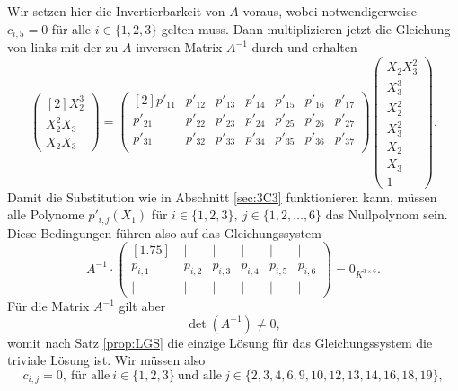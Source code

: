 \documentclass[a4paper,oneside, 11pt, openany%
]{article}
\theoremstyle{custom}
\theoremstyle{custom}
\begin{document}
	Wir setzen hier die Invertierbarkeit von $A$  voraus, wobei notwendigerweise $c_{i,5}=0$ für alle $i \in \{1,2,3\}$  gelten muss. Dann multiplizieren jetzt die Gleichung von links mit der zu $A$ inversen Matrix $A^{-1}$ durch und erhalten
	\begin{equation*}
		\begin{pmatrix}[2]
			X_{2}^3\\
			X_{2}^2X_{3}\\
			X_{2}X_{3}
		\end{pmatrix}
		=
		\begin{pmatrix}[2]
			p'_{11}&p'_{12}& p'_{13}& p'_{14}& p'_{15}& p'_{16}& p'_{17}\\
			p'_{21}&p'_{22}& p'_{23}& p'_{24}& p'_{25}& p'_{26}& p'_{27}\\
			p'_{31}&p'_{32}& p'_{33}& p'_{34}& p'_{35}& p'_{36}& p'_{37}\\
		\end{pmatrix}
		\begin{pmatrix}
			X_{2}X_{3}^2\\
			X_{3}^3\\
			X_{2}^2\\
			X_{3}^2\\
			X_{2}\\
			X_{3}\\
			1
		\end{pmatrix}.
	\end{equation*}
	Damit die Substitution wie in Abschnitt \ref{sec:3C3} funktionieren kann, müssen alle Polynome
	$p'_{i,j}(X_{1})$ für $i \in \{1,2,3\}, \ j \in \{1,2,\dots,6\}$ das Nullpolynom sein.
	Diese Bedingungen führen also auf das Gleichungssystem
	\begin{equation}
		A^{-1} \cdot \begin{pmatrix}[1.75]
			\vert & \vert & \vert & \vert & \vert & \vert\\
			p_{i,1}&p_{i,2}& p_{i,3}&p_{i,4}&p_{i,5}& p_{i,6}\\
			\vert & \vert & \vert & \vert & \vert & \vert
		\end{pmatrix}
		= 0_{K^{3 \times 6}}.
	\end{equation}
	Für die Matrix $A^{-1}$ gilt aber \begin{equation*}
		\det{\left(A^{-1}\right)} \neq 0,
	\end{equation*} womit nach Satz \ref{prop:LGS} die einzige Lösung für das Gleichungssystem die triviale Lösung ist.
	Wir müssen also
	\begin{equation*}
		c_{i,j} = 0 , \ \text{für alle} \ i \in \{1,2,3\} \ \text{und alle} \ j \in \{2,3,4,6,9,10,12,13,14,16,18,19\},
	\end{equation*}
\end{document}

